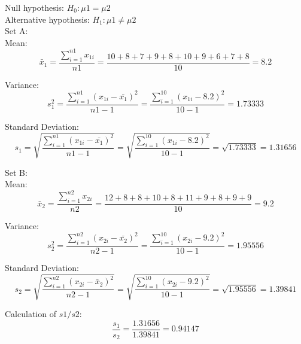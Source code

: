 \documentclass[a4paper,11pt,openright]{report}
\begin{document}
\begin{enumerate}
Null hypothesis: $H_{0}: \mu 1 = \mu 2$ \\
Alternative hypothesis: $H_{1}: \mu 1 \neq \mu 2$ \\

Set A: \\ 
\hspace*{10mm} Mean:
\begin{equation*}
\bar x_{1} = \frac{\sum\limits_{i=1}^{n1} x_{1i}}{n1}
    	= \frac{10 + 8 + 7 + 9 + 8 + 10 + 9 + 6 + 7 + 8}{10}
    	= 8.2
\end{equation*}

\hspace*{10mm} Variance:
\begin{equation*}
s_{1}^{2} = \frac{\sum\limits_{i=1}^{n1} (x_{1i} - \bar {x_{1}})^{2}}{n1 - 1}
		= \frac{\sum\limits_{i=1}^{10} (x_{1i} - 8.2)^{2}}{10 -1} = 1.73333
\end{equation*}

\hspace*{10mm} Standard Deviation:
\begin{equation*}
s_{1} = \sqrt{\frac{\sum\limits_{i=1}^{n1} (x_{1i} - \bar {x_{1}})^{2}}{n1 - 1}}
	= \sqrt{\frac{\sum\limits_{i=1}^{10} (x_{1i} - 8.2)^{2}}{10 -1}}
	= \sqrt{1.73333} = 1.31656
\end{equation*}

Set B: \\
\hspace*{10mm} Mean:
\begin{equation*}
\bar x_{2} = \frac{\sum\limits_{i=1}^{n2} x_{2i}}{n2}
	= \frac{12 + 8 + 8 + 10 + 8 + 11 + 9 + 8 + 9 + 9}{10}
	= 9.2
\end{equation*}

\hspace*{10mm} Variance:
\begin{equation*}
s_{2}^{2} = \frac{\sum\limits_{i=1}^{n2} (x_{2i} - \bar {x_{2}})^{2}}{n2 - 1}
= \frac{\sum\limits_{i=1}^{10} (x_{2i} - 9.2)^{2}}{10 -1} = 1.95556
\end{equation*}

\hspace*{10mm} Standard Deviation:
\begin{equation*}
s_{2} = \sqrt{\frac{\sum\limits_{i=1}^{n2} (x_{2i} - \bar x_{2})^{2}}{n2 - 1}}
= \sqrt{\frac{\sum\limits_{i=1}^{10} (x_{2i} - 9.2)^{2}}{10 -1}}
= \sqrt{1.95556} = 1.39841
\end{equation*}

Calculation of $s1/s2$:
\begin{equation*}
\frac{s_{1}}{s_{2}} = \frac{1.31656}{1.39841} = 0.94147
\end{equation*}


\end{enumerate}
\end{document}
